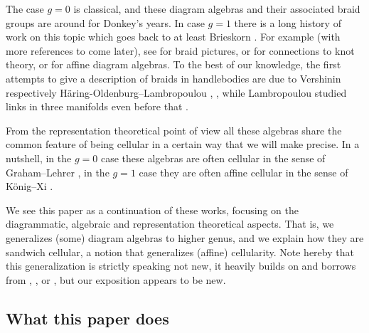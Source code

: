 \documentclass[a4paper,11pt]{amsart}
\numberwithin{equation}{section}
\begin{document}
The case $g=0$ is classical, and these diagram algebras and their associated 
braid groups are around for Donkey's years. 
In case $g=1$ there is a long history of work on this topic which 
goes back to at least Brieskorn \cite{Brieskorn}.
For example (with more references to come later), see
\cite{allcock} for braid pictures, \cite{Geck-Lambropoulou} or \cite{OrRa-affine-braids} for connections 
to knot theory, \cite{Gr-gen-tl-algebra} 
or \cite{HaOl-cyclotomic-bmw} for affine diagram algebras.
To the best of our knowledge, the first attempts to give a
description of braids in handlebodies are due to Vershinin \cite{Ve-handlebodies}
respectively H{\"a}ring-Oldenburg--Lambropoulou \cite{La-handlebodies}, \cite{HaOlLa-handlebodies}, 
while Lambropoulou studied links in three manifolds even before that \cite{La-PhDThesis}.

From the representation theoretical point of view all these 
algebras share the common feature of being cellular in a certain way
that we will make precise. In a nutshell, in the $g=0$ case 
these algebras are often cellular in the sense of Graham--Lehrer \cite{GrLe-cellular}, 
in the $g=1$ case they are often affine cellular in the sense of K{\"o}nig--Xi \cite{KoXi-affine-cellular}.

We see this paper as a continuation of these works, focusing on the diagrammatic, 
algebraic and representation theoretical aspects. That is, we generalizes 
(some) diagram algebras to higher genus, and 
we explain how they are sandwich cellular, a notion that 
generalizes (affine) cellularity. 
Note hereby that this generalization is strictly speaking not new, 
it heavily builds on and borrows from \cite{Gr-semigroups}, \cite{KoXi-cellular-inflation-morita}, \cite{GuWi-almost-cellular} 
or \cite{EhTu-relcell}, 
but our exposition appears to be new.

\subsection{What this paper does}
\end{document}

